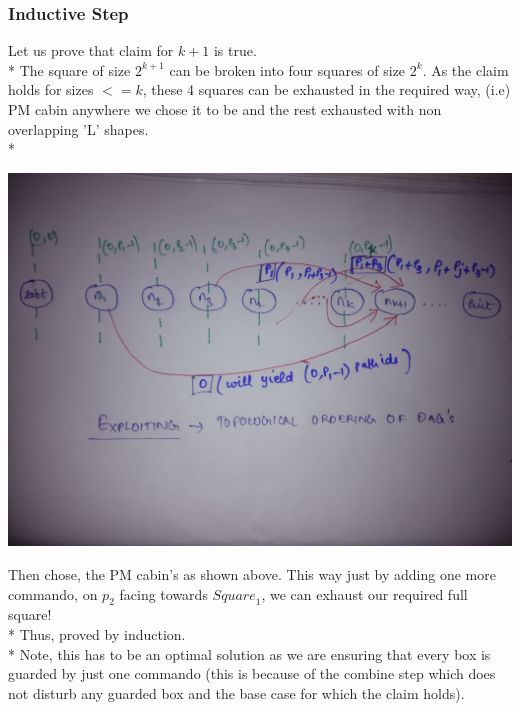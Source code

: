 \documentclass{article}
\begin{document}
\subsubsection{Inductive Step}
Let us prove that claim for $ k+1 $ is true. \\*
The square of size $2^{k+1}$ can be broken into four squares of size $2^{k}$. As the claim holds for sizes $<=k$, these 4 squares can be exhausted in the required way, (i.e) PM cabin anywhere we chose it to be and the rest exhausted with non overlapping 'L' shapes. \\*
\begin{center}
\includegraphics[scale=0.09]{3.jpg}
\end{center}
Then chose, the PM cabin's as shown above. This way just by adding one more commando, on $p_2$ facing towards ${Square}_1$, we can exhaust our required full square! \\*
Thus, proved by induction. \\*
Note, this has to be an optimal solution as we are ensuring that every box is guarded by just one commando (this is because of the combine step which does not disturb any guarded box and the base case for which the claim holds). 
\end{document}
